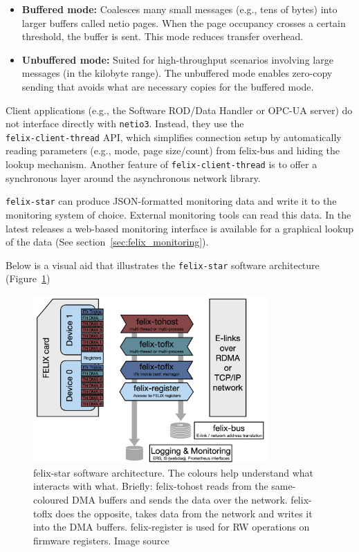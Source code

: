 \begin{itemize}
    \item \textbf{Buffered mode:} Coalesces many small messages (e.g., tens of bytes) into larger buffers called netio pages. When the page occupancy crosses a certain threshold, the buffer is sent. This mode reduces transfer overhead.
    \item \textbf{Unbuffered mode:} Suited for high-throughput scenarios involving large messages (in the kilobyte range). The unbuffered mode enables zero-copy sending that avoids what are necessary copies for the buffered mode.
\end{itemize}

Client applications (e.g., the Software ROD/Data Handler \cite{swrod-repository} or \acs{OPC-UA} \cite{opc-ua} server) do not interface directly with \texttt{netio3}. Instead, they use the\\ \texttt{felix-client-thread} \acs{API}, which simplifies connection setup by automatically reading parameters (e.g., mode, page size/count) from felix-bus and hiding the lookup mechanism. Another feature of \texttt{felix-client-thread} is to offer a synchronous layer around the asynchronous network library.

\texttt{felix-star} can produce JSON-formatted monitoring data and write it to the monitoring system of choice. External monitoring tools can read this data. In the latest releases a web-based monitoring interface is available for a graphical lookup of the data (See section~\ref{sec:felix_monitoring}).

Below is a visual aid that illustrates the \texttt{felix-star} software architecture (Figure~\ref{fig:felix-star})

\begin{figure}[htbp]
\centering
\includegraphics[width=0.8\textwidth]{images/felix/felix-star-architecture.png}
\caption[felix-star software architecture]{felix-star software architecture. The colours help understand what interacts with what. Briefly: felix-tohost reads from the same-coloured DMA buffers and sends the data over the network. felix-toflx does the opposite, takes data from the network and writes it into the DMA buffers. felix-register is used for RW operations on firmware registers. Image source \cite{felix-user-manual}}
\label{fig:felix-star}
\end{figure}

